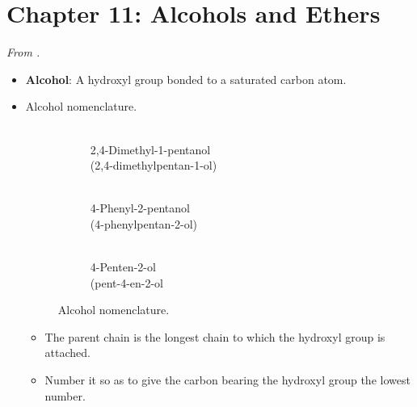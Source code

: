 \documentclass[../notes.tex]{subfiles}
\begin{document}
\section{Chapter 11: Alcohols and Ethers}
\emph{From \textcite{bib:SolomonsEtAl}.}
\begin{itemize}
    \item {}\textbf{Alcohol}: A hydroxyl group bonded to a saturated carbon atom.
    \item Alcohol nomenclature.
    \begin{figure}[h!]
        \centering
        \footnotesize
        \captionsetup{justification=centering}
        \begin{subfigure}[b]{0.33\linewidth}
            \centering
            \vspace{1em}
            \caption{\\2,4-Dimethyl-1-pentanol\\(2,4-dimethylpentan-1-ol)}
            \label{fig:alcoholNomenclaturea}
        \end{subfigure}
        \begin{subfigure}[b]{0.32\linewidth}
            \centering
            \vspace{1em}
            \caption{\\4-Phenyl-2-pentanol\\(4-phenylpentan-2-ol)}
            \label{fig:alcoholNomenclatureb}
        \end{subfigure}
        \begin{subfigure}[b]{0.33\linewidth}
            \centering
            \vspace{1em}
            \caption{\\4-Penten-2-ol\\(pent-4-en-2-ol}
            \label{fig:alcoholNomenclaturec}
        \end{subfigure}
        \caption{Alcohol nomenclature.}
        \label{fig:alcoholNomenclature}
    \end{figure}
    \begin{itemize}
        \item The parent chain is the longest chain to which the hydroxyl group is attached.
        \item Number it so as to give the carbon bearing the hydroxyl group the lowest number.

\end{itemize}
\end{itemize}
\end{document}

